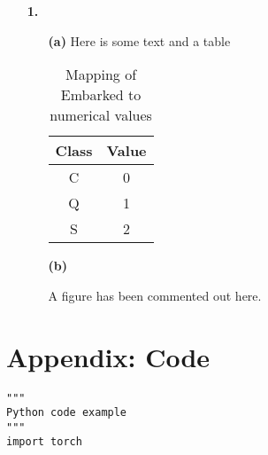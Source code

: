 \documentclass[12pt]{article}
\author{Matthew Gilpin}
\begin{document}
\newpage


\begin{itemize}
\item[{\bf 1.}] 
\begin{itemize}
\item[{\bf (a)}]
Here is some text and a table 

\begin{table}[h!]
\caption{Mapping of Embarked to numerical values}
    \centering
    \begin{tabular}{|c|c|}
    \hline
    \textbf{Class} & \textbf{Value} \\
    \hline
    C & 0 \\
    \hline
    Q & 1 \\
    \hline
    S & 2 \\
    \hline
    \end{tabular}
    
    \label{tab:embarkedmapping}
\end{table}


\item[{\bf (b)}]


A figure has been commented out here.


\end{itemize}
\end{itemize}

\newpage
\appendix
\section{Appendix: Code}
\begin{lstlisting}[style=PythonStyle]
"""
Python code example
"""
import torch 

\end{lstlisting}
 
\end{document}
